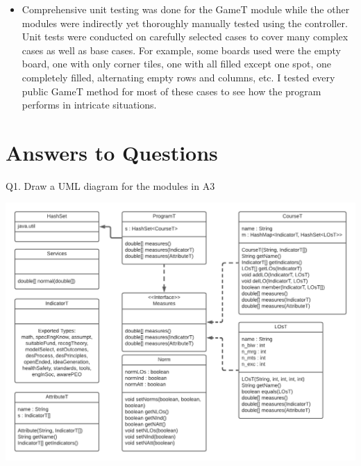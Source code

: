 \documentclass[12pt]{article}
\begin{document}
\begin{itemize}
    \item Comprehensive unit testing was done for the GameT module while the other modules were indirectly yet thoroughly manually tested using the controller. Unit tests were conducted on carefully selected cases to cover many complex cases as well as base cases. For example, some boards used were the empty board, one with only corner tiles, one with all filled except one spot, one completely filled, alternating empty rows and columns, etc. I tested every public GameT method for most of these cases to see how the program performs in intricate situations.
\end{itemize}
\newpage
\section*{Answers to Questions}

Q1. Draw a UML diagram for the modules in A3

\begin{center}
\includegraphics[scale=0.7]{Q1_UML.png}
\end{center}
\end{document}
